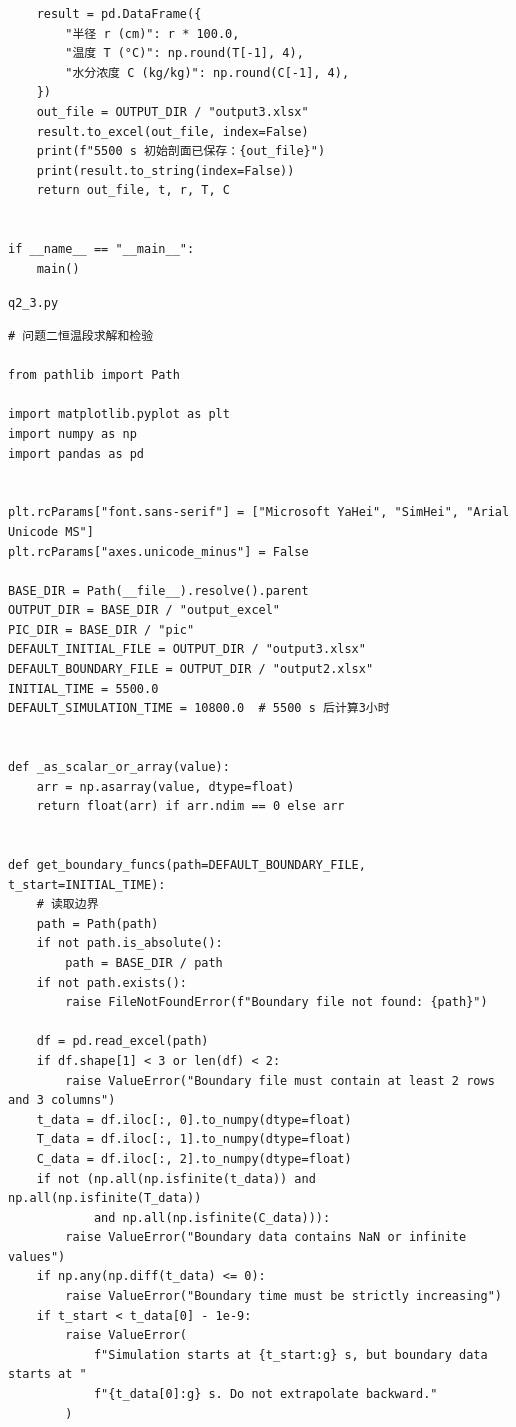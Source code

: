 \documentclass[withoutpreface,bwprint]{cumcm_thesis}
\begin{document}
\begin{appendices}
\begin{lstlisting}
    result = pd.DataFrame({
        "半径 r (cm)": r * 100.0,
        "温度 T (°C)": np.round(T[-1], 4),
        "水分浓度 C (kg/kg)": np.round(C[-1], 4),
    })
    out_file = OUTPUT_DIR / "output3.xlsx"
    result.to_excel(out_file, index=False)
    print(f"5500 s 初始剖面已保存：{out_file}")
    print(result.to_string(index=False))
    return out_file, t, r, T, C


if __name__ == "__main__":
    main()

\end{lstlisting}
\noindent\texttt{q2\_3.py}
\begin{lstlisting}
# 问题二恒温段求解和检验

from pathlib import Path

import matplotlib.pyplot as plt
import numpy as np
import pandas as pd


plt.rcParams["font.sans-serif"] = ["Microsoft YaHei", "SimHei", "Arial Unicode MS"]
plt.rcParams["axes.unicode_minus"] = False

BASE_DIR = Path(__file__).resolve().parent
OUTPUT_DIR = BASE_DIR / "output_excel"
PIC_DIR = BASE_DIR / "pic"
DEFAULT_INITIAL_FILE = OUTPUT_DIR / "output3.xlsx"
DEFAULT_BOUNDARY_FILE = OUTPUT_DIR / "output2.xlsx"
INITIAL_TIME = 5500.0
DEFAULT_SIMULATION_TIME = 10800.0  # 5500 s 后计算3小时


def _as_scalar_or_array(value):
    arr = np.asarray(value, dtype=float)
    return float(arr) if arr.ndim == 0 else arr


def get_boundary_funcs(path=DEFAULT_BOUNDARY_FILE, t_start=INITIAL_TIME):
    # 读取边界
    path = Path(path)
    if not path.is_absolute():
        path = BASE_DIR / path
    if not path.exists():
        raise FileNotFoundError(f"Boundary file not found: {path}")

    df = pd.read_excel(path)
    if df.shape[1] < 3 or len(df) < 2:
        raise ValueError("Boundary file must contain at least 2 rows and 3 columns")
    t_data = df.iloc[:, 0].to_numpy(dtype=float)
    T_data = df.iloc[:, 1].to_numpy(dtype=float)
    C_data = df.iloc[:, 2].to_numpy(dtype=float)
    if not (np.all(np.isfinite(t_data)) and np.all(np.isfinite(T_data))
            and np.all(np.isfinite(C_data))):
        raise ValueError("Boundary data contains NaN or infinite values")
    if np.any(np.diff(t_data) <= 0):
        raise ValueError("Boundary time must be strictly increasing")
    if t_start < t_data[0] - 1e-9:
        raise ValueError(
            f"Simulation starts at {t_start:g} s, but boundary data starts at "
            f"{t_data[0]:g} s. Do not extrapolate backward."
        )


\end{lstlisting}
\end{appendices}
\end{document}
